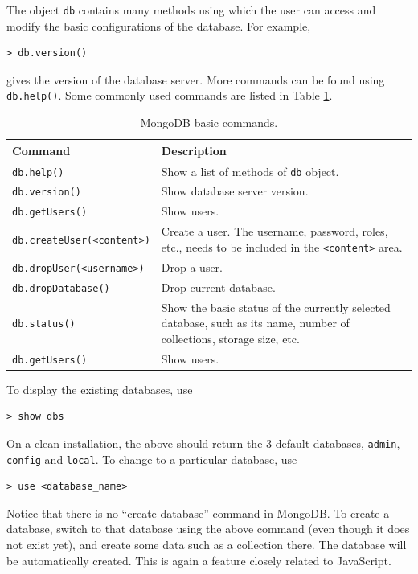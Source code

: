 The object \verb|db| contains many methods using which the user can access and modify the basic configurations of the database. For example,
\begin{lstlisting}
> db.version()
\end{lstlisting}
gives the version of the database server. More commands can be found using \verb|db.help()|. Some commonly used commands are listed in Table \ref{ch:db:tab:mongodbbasics}.
\begin{table}
	\centering \caption{MongoDB basic commands.}\label{ch:db:tab:mongodbbasics}
	\begin{tabularx}{\textwidth}{lX}
		\hline
		Command & Description \\ \hline
        \verb|db.help()| & Show a list of methods of \verb|db| object. \\ \hdashline
		\verb|db.version()| & Show database server version. \\ \hdashline
        \verb|db.getUsers()| & Show users. \\ \hdashline
        \verb|db.createUser(<content>)| & Create a user. The username, password, roles, etc., needs to be included in the \verb|<content>| area. \\ \hdashline
        \verb|db.dropUser(<username>)| & Drop a user. \\ \hdashline
        \verb|db.dropDatabase()| & Drop current database. \\ \hdashline
		\verb|db.status()| & Show the basic status of the currently selected database, such as its name, number of collections, storage size, etc.  \\ \hdashline
        \verb|db.getUsers()| & Show users. \\
		 \hline
	\end{tabularx}
\end{table}

To display the existing databases, use
\begin{lstlisting}
> show dbs
\end{lstlisting}
On a clean installation, the above should return the 3 default databases, \verb|admin|, \verb|config| and \verb|local|. To change to a particular database, use
\begin{lstlisting}
> use <database_name>
\end{lstlisting}
Notice that there is no ``create database'' command in MongoDB. To create a database, switch to that database using the above command (even though it does not exist yet), and create some data such as a collection there. The database will be automatically created. This is again a feature closely related to JavaScript.

